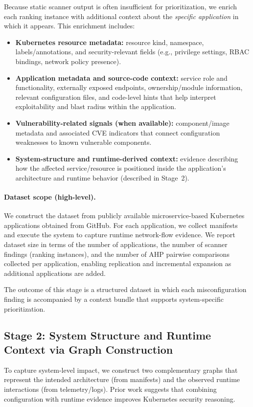 \documentclass[12pt]{article}
\begin{document}
Because static scanner output is often insufficient for prioritization, we enrich each ranking instance with additional context about the \emph{specific application} in which it appears. This enrichment includes:
\begin{itemize}
    \item \textbf{Kubernetes resource metadata:} resource kind, namespace, labels/annotations, and security-relevant fields (e.g., privilege settings, RBAC bindings, network policy presence).
    \item \textbf{Application metadata and source-code context:} service role and functionality, externally exposed endpoints, ownership/module information, relevant configuration files, and code-level hints that help interpret exploitability and blast radius within the application.
    \item \textbf{Vulnerability-related signals (when available):} component/image metadata and associated CVE indicators that connect configuration weaknesses to known vulnerable components.
    \item \textbf{System-structure and runtime-derived context:} evidence describing how the affected service/resource is positioned inside the application's architecture and runtime behavior (described in Stage~2).
\end{itemize}

\paragraph{Dataset scope (high-level).}
We construct the dataset from publicly available microservice-based Kubernetes applications obtained from GitHub. For each application, we collect manifests and execute the system to capture runtime network-flow evidence. We report dataset size in terms of the number of applications, the number of scanner findings (ranking instances), and the number of AHP pairwise comparisons collected per application, enabling replication and incremental expansion as additional applications are added.

The outcome of this stage is a structured dataset in which each misconfiguration finding is accompanied by a context bundle that supports system-specific prioritization.

\subsection{Stage 2: System Structure and Runtime Context via Graph Construction}
\label{subsec:stage2}
To capture system-level impact, we construct two complementary graphs that represent the intended architecture (from manifests) and the observed runtime interactions (from telemetry/logs). Prior work suggests that combining configuration with runtime evidence improves Kubernetes security reasoning.
\end{document}

